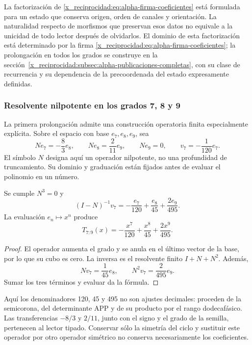 La factorización de \eqref{x_reciprocidad:eq:alpha-firma-coeficientes} está formulada
para un estado que conserva origen, orden de canales y orientación. La
naturalidad respecto de morfismos que preservan esos datos no equivale a
la unicidad de todo lector después de olvidarlos. El dominio de esta
factorización está determinado por la firma
\eqref{x_reciprocidad:eq:alpha-firma-coeficientes}; la prolongación en todos los grados
se construye en la sección~\ref{x_reciprocidad:subsec:alpha-publicaciones-completas},
con su clase de recurrencia y su dependencia de la precoordenada del estado
expresamente definidas.

\subsubsection{Resolvente nilpotente en los grados 7, 8 y 9}
\label{x_reciprocidad:subsec:alpha-resolvente}

La primera prolongación admite una construcción operatoria finita
especialmente explícita. Sobre el espacio con base \(e_7,e_8,e_9\),
sea
\[
 Ne_7=-\frac83e_8,\qquad Ne_8=\frac2{11}e_9,\qquad Ne_9=0,
 \qquad v_7=-\frac1{120}e_7.
\]
El símbolo \(N\) designa aquí un operador nilpotente, no una profundidad
de truncamiento. Su dominio y graduación están fijados antes de evaluar
el polinomio en un número.

\begin{lemma}
\label{x_reciprocidad:lem:alpha-resolvente}
Se cumple \(N^3=0\) y
\[
 (I-N)^{-1}v_7
 =-\frac{e_7}{120}+\frac{e_8}{45}+\frac{2e_9}{495}.
\]
La evaluación \(e_n\mapsto x^n\) produce
\begin{equation}
 T_{7:9}(x)=-\frac{x^7}{120}+\frac{x^8}{45}+\frac{2x^9}{495}.
 \label{x_reciprocidad:eq:alpha-t79}
\end{equation}
\end{lemma}

\begin{proof}
El operador aumenta el grado y se anula en el último vector de la base,
por lo que su cubo es cero. La inversa es el resolvente finito
\(I+N+N^2\). Además,
\[
 Nv_7=\frac1{45}e_8,\qquad N^2v_7=\frac2{495}e_9.
\]
Sumar los tres términos y evaluar da la fórmula.
\end{proof}

Aquí los denominadores 120, 45 y 495 no son ajustes decimales: proceden
de la semicorona, del determinante APP y de su producto por el rango
dodecafásico. Las transferencias \(-8/3\) y \(2/11\), junto con el
signo y el grado de la semilla, pertenecen al lector tipado. Conservar
sólo la simetría del ciclo y sustituir este operador por otro operador
simétrico no conserva necesariamente los coeficientes.

